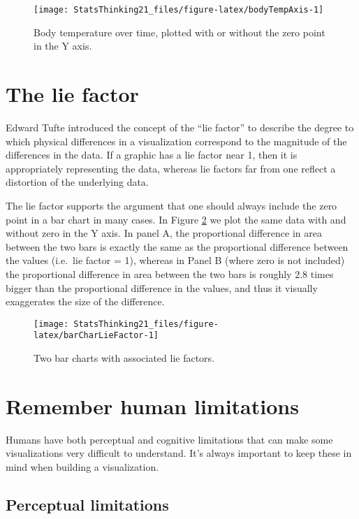 \documentclass[]{book}
\theoremstyle{definition}
\theoremstyle{definition}
\theoremstyle{definition}
\theoremstyle{remark}
\begin{document}
\begin{figure}
\texttt{[image: StatsThinking21\_files/figure-latex/bodyTempAxis-1]} \caption{Body temperature over time, plotted with or without the zero point in the Y axis.}\label{fig:bodyTempAxis}
\end{figure}

\section{The lie factor}\label{the-lie-factor}

Edward Tufte introduced the concept of the ``lie factor'' to describe
the degree to which physical differences in a visualization correspond
to the magnitude of the differences in the data. If a graphic has a lie
factor near 1, then it is appropriately representing the data, whereas
lie factors far from one reflect a distortion of the underlying data.

The lie factor supports the argument that one should always include the
zero point in a bar chart in many cases. In Figure
\ref{fig:barCharLieFactor} we plot the same data with and without zero
in the Y axis. In panel A, the proportional difference in area between
the two bars is exactly the same as the proportional difference between
the values (i.e.~lie factor = 1), whereas in Panel B (where zero is not
included) the proportional difference in area between the two bars is
roughly 2.8 times bigger than the proportional difference in the values,
and thus it visually exaggerates the size of the difference.

\begin{figure}
\texttt{[image: StatsThinking21\_files/figure-latex/barCharLieFactor-1]} \caption{Two bar charts with associated lie factors.}\label{fig:barCharLieFactor}
\end{figure}

\section{Remember human limitations}\label{remember-human-limitations}

Humans have both perceptual and cognitive limitations that can make some
visualizations very difficult to understand. It's always important to
keep these in mind when building a visualization.

\subsection{Perceptual limitations}\label{perceptual-limitations}
\end{document}

